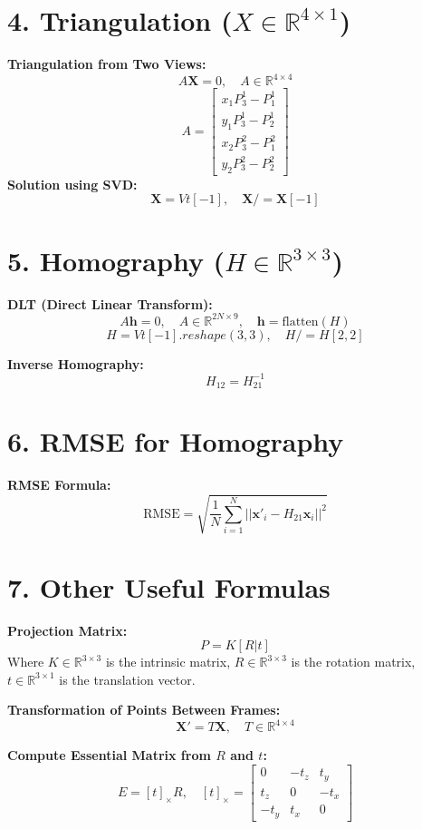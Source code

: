 \documentclass[a4paper,10pt]{article}
\begin{document}
\begin{multicols}{2}
\section*{4. Triangulation ($X \in \mathbb{R}^{4 \times 1}$)}
\textbf{Triangulation from Two Views:}
\[
A \mathbf{X} = 0, \quad A \in \mathbb{R}^{4 \times 4}
\]
\[
A = \begin{bmatrix} x_1 P_3^1 - P_1^1 \\ y_1 P_3^1 - P_2^1 \\ x_2 P_3^2 - P_1^2 \\ y_2 P_3^2 - P_2^2 \end{bmatrix}
\]
\textbf{Solution using SVD:}
\[
\mathbf{X} = Vt[-1], \quad \mathbf{X} /= \mathbf{X}[-1]
\]

\section*{5. Homography ($H \in \mathbb{R}^{3 \times 3}$)}
\textbf{DLT (Direct Linear Transform):}
\[
A \mathbf{h} = 0, \quad A \in \mathbb{R}^{2N \times 9}, \quad \mathbf{h} = \text{flatten}(H)
\]
\[
H = Vt[-1].reshape(3, 3), \quad H /= H[2, 2]
\]

\textbf{Inverse Homography:}
\[
H_{12} = H_{21}^{-1}
\]

\section*{6. RMSE for Homography}
\textbf{RMSE Formula:}
\[
\text{RMSE} = \sqrt{\frac{1}{N} \sum_{i=1}^N ||\mathbf{x'}_i - H_{21} \mathbf{x}_i||^2}
\]

\section*{7. Other Useful Formulas}

\textbf{Projection Matrix:}
\[
P = K [R | t]
\]
Where $K \in \mathbb{R}^{3 \times 3}$ is the intrinsic matrix, $R \in \mathbb{R}^{3 \times 3}$ is the rotation matrix, $t \in \mathbb{R}^{3 \times 1}$ is the translation vector.

\textbf{Transformation of Points Between Frames:}
\[
\mathbf{X'} = T \mathbf{X}, \quad T \in \mathbb{R}^{4 \times 4}
\]

\textbf{Compute Essential Matrix from $R$ and $t$:}
\[
E = [t]_\times R, \quad [t]_\times = \begin{bmatrix} 0 & -t_z & t_y \\ t_z & 0 & -t_x \\ -t_y & t_x & 0 \end{bmatrix}
\]

\end{multicols}
\end{document}
